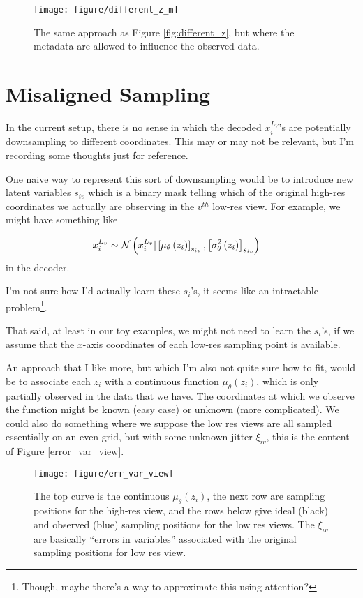 \documentclass{article}
\begin{document}
\begin{figure}[ht]
  \centering
  \texttt{[image: figure/different\_z\_m]}
  \caption{The same approach as Figure \ref{fig:different_z}, but where the
    metadata are allowed to influence the observed
    data. \label{fig:different_z_m} }
\end{figure}

\section{Misaligned Sampling}
\label{sec:mis_sampling}

In the current setup, there is no sense in which the decoded $x_i^{L_V}$'s are
potentially downsampling to different coordinates. This may or may not be
relevant, but I'm recording some thoughts just for reference.

One naive way to represent this sort of downsampling would be to introduce new
latent variables $s_{iv}$ which is a binary mask telling which of the original
high-res coordinates we actually are observing in the $v^{th}$ low-res view. For
example, we might have something like

\begin{align*}
x_{i}^{L_v} &\sim \mathcal{N}\left(x_{i}^{L_{v}} \vert
\left[\mu_{\theta}\left(z_{i}\right)\right]_{s_{iv}},
\left[\sigma^2_{\theta}\left(z_i\right)\right]_{s_{iv}}\right)
\end{align*}
in the decoder.

I'm not sure how I'd actually learn these $s_{i}$'s, it seems like an
intractable problem\footnote{Though, maybe there's a way to approximate this
  using attention?}.

That said, at least in our toy examples, we might not need to learn the $s_i$'s,
if we assume that the $x$-axis coordinates of each low-res sampling point is
available.

An approach that I like more, but which I'm also not quite sure how to fit,
would be to associate each $z_i$ with a continuous function
$\mu_{\theta}\left(z_{i}\right)$, which is only partially observed in the data
that we have. The coordinates at which we observe the function might be known
(easy case) or unknown (more complicated). We could also do something where we
suppose the low res views are all sampled essentially on an even grid, but with
some unknown jitter $\xi_{iv}$, this is the content of
Figure \ref{error_var_view}.

\begin{figure}[ht]
  \centering
  \texttt{[image: figure/err\_var\_view]}
  \caption{The top curve is the continuous $\mu_{\theta}\left(z_i\right)$, the
    next row are sampling positions for the high-res view, and the rows below
    give ideal (black) and observed (blue) sampling positions for the low res
    views. The $\xi_{iv}$ are basically ``errors in variables'' associated with
    the original sampling positions for low res view.\label{fig:err_var_view} }
\end{figure}
\end{document}
